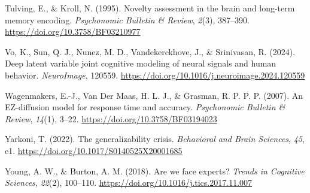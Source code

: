 \documentclass[
  letterpaper,
  DIV=11,
  numbers=noendperiod]{scrartcl}
\newlength{\cslhangindent}
\newenvironment{CSLReferences}[2] %
 {\begin{list}{}{%
  \setlength{\itemindent}{0pt}
  \setlength{\leftmargin}{0pt}
  \setlength{\parsep}{0pt}
  \ifodd #1
   \setlength{\leftmargin}{\cslhangindent}
   \setlength{\itemindent}{-1\cslhangindent}
  \fi
  \setlength{\itemsep}{#2\baselineskip}}}
 {\end{list}}
\begin{document}
\begin{CSLReferences}{1}{0}
Tulving, E., \& Kroll, N. (1995). Novelty assessment in the brain and
long-term memory encoding. \emph{Psychonomic Bulletin \& Review},
\emph{2}(3), 387--390. \url{https://doi.org/10.3758/BF03210977}

Vo, K., Sun, Q. J., Nunez, M. D., Vandekerckhove, J., \& Srinivasan, R.
(2024). Deep latent variable joint cognitive modeling of neural signals
and human behavior. \emph{NeuroImage}, 120559.
\url{https://doi.org/10.1016/j.neuroimage.2024.120559}

Wagenmakers, E.-J., Van Der Maas, H. L. J., \& Grasman, R. P. P. P.
(2007). An EZ-diffusion model for response time and accuracy.
\emph{Psychonomic Bulletin \& Review}, \emph{14}(1), 3--22.
\url{https://doi.org/10.3758/BF03194023}

Yarkoni, T. (2022). The generalizability crisis. \emph{Behavioral and
Brain Sciences}, \emph{45}, e1.
\url{https://doi.org/10.1017/S0140525X20001685}

Young, A. W., \& Burton, A. M. (2018). Are we face experts? \emph{Trends
in Cognitive Sciences}, \emph{22}(2), 100--110.
\url{https://doi.org/10.1016/j.tics.2017.11.007}

\end{CSLReferences}
\end{document}
